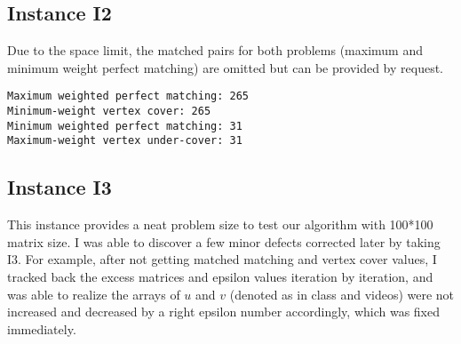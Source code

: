 \documentclass[11pt]{article}
\begin{document}
\subsection{Instance I2}
Due to the space limit, the matched pairs for both problems (maximum and minimum weight perfect matching) are omitted but can be provided by request.%



\begin{verbatim}
Maximum weighted perfect matching: 265
Minimum-weight vertex cover: 265
Minimum weighted perfect matching: 31
Maximum-weight vertex under-cover: 31
\end{verbatim}

\subsection{Instance I3}
This instance provides a neat problem size to test our algorithm with 100*100 matrix size. I was able to discover a few minor defects corrected later by taking I3. For example, after not getting matched matching and vertex cover values, I tracked back the excess matrices and epsilon values iteration by iteration, and was able to realize the arrays of $u$ and $v$ (denoted as in class and videos) were not increased and decreased by a right epsilon number accordingly, which was fixed immediately.%
\end{document}
